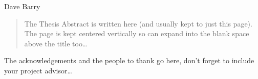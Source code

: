 \documentclass[
11pt, %
spanish, %
onehalfspacing, %
]{MastersDoctoralThesis_custom} %
\begin{document}
\hfill Dave Barry


\begin{abstract}
\addchaptertocentry{\abstractname} %

The Thesis Abstract is written here (and usually kept to just this page). The page is kept centered vertically so can expand into the blank space above the title too\ldots

\end{abstract}


\begin{acknowledgements}
\addchaptertocentry{\acknowledgementname} %

The acknowledgements and the people to thank go here, don't forget to include your project advisor\ldots

\end{acknowledgements}

\renewcommand{\contentsname}{Indice}
\tableofcontents %
\renewcommand{\figurename}{Figura}
\renewcommand{\tablename}{Tabla}



%
%
\end{document}
